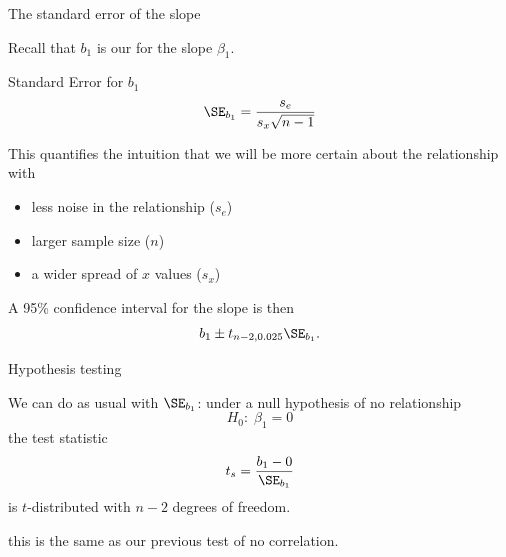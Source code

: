 \begin{frame}{The standard error of the slope}

  Recall that $b_1$ is our  for the slope $\beta_1$.

  \begin{block}{Standard Error for $b_1$}
      \[
          \SE_{b_1} = \frac{ s_e }{ s_x \sqrt{n-1} }
      \]
  \end{block}

    \vspace{2em}
    
    \pause

    This quantifies the intuition that
    we will be more certain about the relationship with
    \begin{itemize}
        \item less noise in the relationship ($s_e$)
        \item larger sample size ($n$)
        \item a wider spread of $x$ values ($s_x$)
    \end{itemize}

    \vspace{2em}

    A 95\% confidence interval for the slope is then
    \[
        b_1 \pm t_{n-2,0.025} \SE_{b_1} .
    \]

\end{frame}


\begin{frame}{Hypothesis testing}

    We can do as usual with $\SE_{b_1}$:
    under a null hypothesis of no relationship
    \[
        H_0: \; \beta_1 = 0
    \]
    the test statistic 
    \[
        t_s = \frac{b_1 - 0}{\SE_{b_1}}
    \]
    is $t$-distributed with $n-2$ degrees of freedom.

    \vspace{2em}

     this is the \alert{same} as our previous test of no correlation.

\end{frame}


